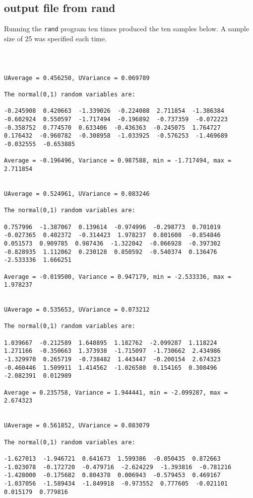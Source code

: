 \documentclass{article}
\begin{document}
\subsection{output file from rand}
\label{sec:randout}
Running the {\tt rand} program ten times produced the ten samples
below.  A sample size of 25 was specified each time.
{\tt
\begin{verbatim}

UAverage = 0.456250, UVariance = 0.069789

The normal(0,1) random variables are:

-0.245908  0.420663  -1.339026  -0.224088  2.711854  -1.386384  
-0.602924  0.550597  -1.717494  -0.196892  -0.737359  -0.072223  
-0.358752  0.774570  0.633406  -0.436363  -0.245075  1.764727  
0.176432  -0.960782  -0.308958  -1.033925  -0.576253  -1.469689  
-0.032555  -0.653885  

Average = -0.196496, Variance = 0.987588, min = -1.717494, max = 2.711854 


UAverage = 0.524961, UVariance = 0.083246

The normal(0,1) random variables are:

0.757996  -1.387067  0.139614  -0.974996  -0.298773  0.701019  
-0.027365  0.402372  -0.314423  1.978237  0.801608  -0.854846  
0.051573  0.909785  0.987436  -1.322042  -0.066928  -0.397302  
-0.828935  1.112062  0.230128  0.850592  -0.540374  0.136476  
-2.533336  1.666251  

Average = -0.019500, Variance = 0.947179, min = -2.533336, max = 1.978237 


UAverage = 0.535653, UVariance = 0.073212

The normal(0,1) random variables are:

1.039667  -0.212589  1.648895  1.182762  -2.099287  1.118224  
1.271166  -0.350663  1.373938  -1.715097  -1.730662  2.434986  
-1.329970  0.265719  -0.738482  1.443447  -0.200154  2.674323  
-0.460446  1.509911  1.414562  -1.026580  0.154165  0.308496  
-2.082391  0.012989  

Average = 0.235758, Variance = 1.944441, min = -2.099287, max = 2.674323 


UAverage = 0.561852, UVariance = 0.083079

The normal(0,1) random variables are:

-1.627013  -1.946721  0.641673  1.599386  -0.050435  0.872663  
-1.023078  -0.172720  -0.479716  -2.624229  -1.393816  -0.781216  
-1.428000  -0.175682  0.804378  0.006943  -0.579453  0.469167  
-1.037056  -1.589434  -1.849918  -0.973552  0.777605  -0.021101  
0.015179  0.779816  


\end{verbatim}}
\end{document}
